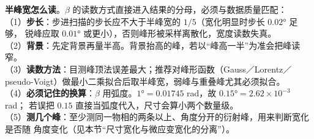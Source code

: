 \begin{measure}
\textbf{半峰宽怎么读}。$\beta$ 的读数方式直接进入结果的分母，必须与数据质量匹配：\\
（1）\textbf{步长}：步进扫描的步长应不大于半峰宽的 $1/5$（宽化明显时步长 $0.02°$ 足够，
锐峰应取 $0.01°$ 或更小），否则峰形被采样离散化，宽度读数失真。\\
（2）\textbf{背景}：先定背景再量半高。背景抬高的峰，若以``峰高一半''为准会把峰读窄。\\
（3）\textbf{读数方法}：目测峰顶法误差最大；推荐对峰形函数（Gauss／Lorentz／
pseudo-Voigt）做最小二乘拟合后取半峰宽，弱峰与重叠峰尤其必须拟合。\\
（4）\textbf{必须记住的换算}：$\beta$ 用弧度。$1°=0.01745$ rad，故 $0.15°=2.62\times10^{-3}$ rad；
若误把 $0.15$ 直接当弧度代入，尺寸会算小两个数量级。\\
（5）\textbf{测几个峰}：至少测同一物相的两条以上、角度分开的衍射峰，用来判断宽化是否随
角度变化（见本节``尺寸宽化与微应变宽化的分离''）。
\end{measure}

